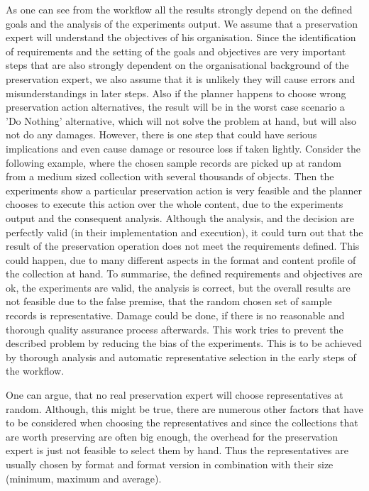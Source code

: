 As one can see from the workflow all the results strongly depend on the defined goals and the analysis of the experiments output. We assume that a preservation expert will understand the objectives of his organisation. Since the identification of requirements and the setting of the goals and objectives are very important steps that are also strongly dependent on the organisational background of the preservation expert, we also assume that it is unlikely they will cause errors and misunderstandings in later steps. Also if the planner happens to choose wrong preservation action alternatives, the result will be in the worst case scenario a 'Do Nothing' alternative, which will not solve the problem at hand, but will also not do any damages.
However, there is one step that could have serious implications and even cause damage or resource loss if taken lightly. Consider the following example, where the chosen sample records are picked up at random from a medium sized collection with several thousands of objects. Then the experiments show a particular preservation action is very feasible and the planner chooses to execute this action over the whole content, due to the experiments output and the consequent analysis. Although the analysis, and the decision are perfectly valid (in their implementation and execution), it could turn out that the result of the preservation operation does not meet the requirements defined. This could happen, due to many different aspects in the format and content profile of the collection at hand. To summarise, the defined requirements and objectives are ok, the experiments are valid, the analysis is correct, but the overall results are not feasible due to the false premise, that the random chosen set of sample records is representative. Damage could be done, if there is no reasonable and thorough quality assurance process afterwards. This work tries to prevent the described problem by reducing the bias of the experiments. This is to be achieved by thorough analysis and automatic representative selection in the early steps of the workflow.

One can argue, that no real preservation expert will choose representatives at random. Although, this might be true, there are numerous other factors that have to be considered when choosing the representatives and since the collections that are worth preserving are often big enough, the overhead for the preservation expert is just not feasible to select them by hand. Thus the representatives are usually chosen by format and format version in combination with their size (minimum, maximum and average).

